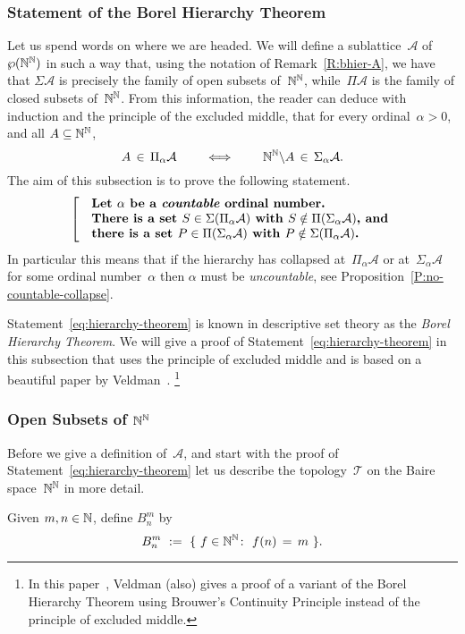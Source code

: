 \documentclass[main.tex]{subfiles}
\begin{document}
\subsubsection{Statement of the Borel Hierarchy Theorem}$\,$\\
Let us spend words on where we are headed.
We will define a sublattice~$\mathcal{A}$
of~$\wp(\mathbb{N}^{\mathbb{N}})$
in such a way that,
using the notation of Remark~\ref{R:bhier-A},
we have that
$\Sigma \mathcal{A}$
is  precisely the family of open subsets of~$\mathbb{N}^{\mathbb{N}}$,
while~$\Pi \mathcal{A}$ is the family
of closed subsets of~$\mathbb{N}^{\mathbb{N}}$.
From this information,
the reader can deduce with induction and the principle
of the excluded middle, that for every ordinal~$\alpha>0$,
and all $A\subseteq\mathbb{N}^{\mathbb{N}}$, 
\begin{equation}
\label{eq:bhier-complement}
A \,\in\, \Pi_\alpha \mathcal{A}
\qquad\iff\qquad
\mathbb{N}^{\mathbb{N}}\backslash A \,\in\, \Sigma_\alpha \mathcal{A}.
\end{equation}
The aim of this subsection
is to prove the following statement.
\begin{equation}
\label{eq:hierarchy-theorem}
\left[\quad
\begin{minipage}{.7\columnwidth}
\textbf{%
Let~$\alpha$ be a \emph{countable} ordinal number.\\
There is a set~$S\in \Sigma(\Pi_\alpha\mathcal{A})$
with $S\notin \Pi(\Sigma_\alpha\mathcal{A})$, and \\
there is a set $P\in\Pi(\Sigma_\alpha\mathcal{A})$
with $P\notin \Sigma(\Pi_\alpha\mathcal{A})$.}
\end{minipage}
\right.
\end{equation}
In particular
this means that if the hierarchy has collapsed
at~$\Pi_\alpha\mathcal{A}$
or at~$\Sigma_\alpha\mathcal{A}$
for some ordinal number~$\alpha$
then $\alpha$ must be \emph{uncountable},
see Proposition~\ref{P:no-countable-collapse}.

Statement~\eqref{eq:hierarchy-theorem}
is known in descriptive set theory
as the \emph{Borel Hierarchy Theorem}.
We will give a proof of Statement~\eqref{eq:hierarchy-theorem}
 in this subsection that
uses the principle of excluded middle
and is based on a beautiful paper by Veldman~\cite[paragraph 5]{Veldman08}.%
\footnote{
In this paper~\cite{Veldman08},
Veldman (also) gives
a proof of a variant of the Borel Hierarchy Theorem
using Brouwer's Continuity Principle
instead of the principle of excluded middle.}

\subsubsection{Open Subsets of $\mathbb{N}^{\mathbb{N}}$}$\,$\label{SSS:bhier-open}\\
Before we give a definition of~$\mathcal{A}$,
and start with the proof of Statement~\eqref{eq:hierarchy-theorem}
let us describe the topology~$\mathcal{T}$ 
on the Baire space~$\mathbb{N}^{\mathbb{N}}$ in more detail.
\begin{dfn}
Given $m,n\in\mathbb{N}$, define $B^m_n$ by
\begin{equation*}
B_n^m\ :=\ \{ \ f\in\mathbb{N}^{\mathbb{N}}\colon\  f(n) \,=\, m \ \}.
\end{equation*}
\end{dfn}
\end{document}
